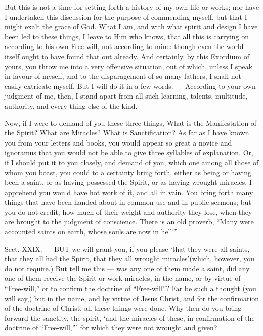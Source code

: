 But this is not a time for setting forth a history of my own life or works; nor have I undertaken this discussion for the purpose of commending myself, but that I might exalt the grace of God. What I am, and with what spirit and design I have been led to these things, I leave to Him who knows, that all this is carrying on according to his own Free-will, not according to mine: though even the world itself ought to have found that out already. And certainly, by this Exordium of yours, you throw me into a very offensive situation, out of which, unless I speak in favour of myself, and to the disparagement of so many fathers, I shall not easily extricate myself. But I will do it in a few words. — According to your own judgment of me, then, I stand apart from all such learning, talents, multitude, authority, and every thing else of the kind.

Now, if I were to demand of you these three things, What is the Manifestation of the Spirit? What are Miracles? What is Sanctification? As far as I have known you from your letters and books, you would appear so great a novice and ignoramus that you would not be able to give three syllables of explanation. Or, if I should put it to you closely, and demand of you, which one among all those of whom you boast, you could to a certainty bring forth, either as being or having been a saint, or as having possessed the Spirit, or as having wrought miracles, I apprehend you would have hot work of it, and all in vain. You bring forth many things that have been handed about in common use and in public sermons; but you do not credit, how much of their weight and authority they lose, when they are brought to the judgment of conscience. There is an old proverb, “Many were accounted saints on earth, whose souls are now in hell!”


Sect. XXIX. — BUT we will grant you, if you please ‘that they were all saints, that they all had the Spirit, that they all wrought miracles’(which, however, you do not require.) But tell me this — was any one of them made a saint, did any one of them receive the Spirit or work miracles, in the name, or by virtue of “Free-will,” or to confirm the doctrine of “Free-will”? Far be such a thought (you will say,) but in the name, and by virtue of Jesus Christ, and for the confirmation of the doctrine of Christ, all these things were done. Why then do you bring forward the sanctity, the spirit, ‘and the miracles of these, in confirmation of the doctrine of “Free-will,”’ for which they were not wrought and given?

